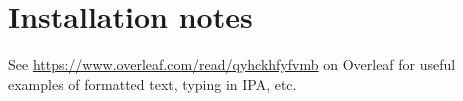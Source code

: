 \documentclass[twoside]{memoir}
\begin{document}
%
%
%
%
%


\appendix
\chapter{Installation notes}

See \url{https://www.overleaf.com/read/qyhckhfyfvmb} on Overleaf for useful examples of formatted text, typing in IPA, etc.

\backmatter

\end{document}
